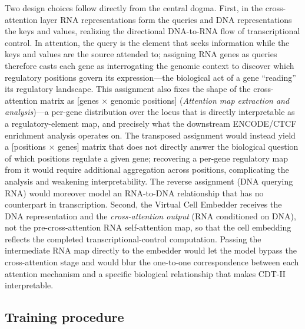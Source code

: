 \documentclass[12pt,a4paper]{article}
\begin{document}
Two design choices follow directly from the central dogma. First, in the cross-attention layer RNA representations form the queries and DNA representations the keys and values, realizing the directional DNA-to-RNA flow of transcriptional control. In attention, the query is the element that seeks information while the keys and values are the source attended to; assigning RNA genes as queries therefore casts each gene as interrogating the genomic context to discover which regulatory positions govern its expression---the biological act of a gene ``reading'' its regulatory landscape. This assignment also fixes the shape of the cross-attention matrix as [genes $\times$ genomic positions] (\emph{Attention map extraction and analysis})---a per-gene distribution over the locus that is directly interpretable as a regulatory-element map, and precisely what the downstream ENCODE/CTCF enrichment analysis operates on. The transposed assignment would instead yield a [positions $\times$ genes] matrix that does not directly answer the biological question of which positions regulate a given gene; recovering a per-gene regulatory map from it would require additional aggregation across positions, complicating the analysis and weakening interpretability. The reverse assignment (DNA querying RNA) would moreover model an RNA-to-DNA relationship that has no counterpart in transcription. Second, the Virtual Cell Embedder receives the DNA representation and the \textit{cross-attention output} (RNA conditioned on DNA), not the pre-cross-attention RNA self-attention map, so that the cell embedding reflects the completed transcriptional-control computation. Passing the intermediate RNA map directly to the embedder would let the model bypass the cross-attention stage and would blur the one-to-one correspondence between each attention mechanism and a specific biological relationship that makes CDT-II interpretable.

\subsection{Training procedure}
\end{document}
